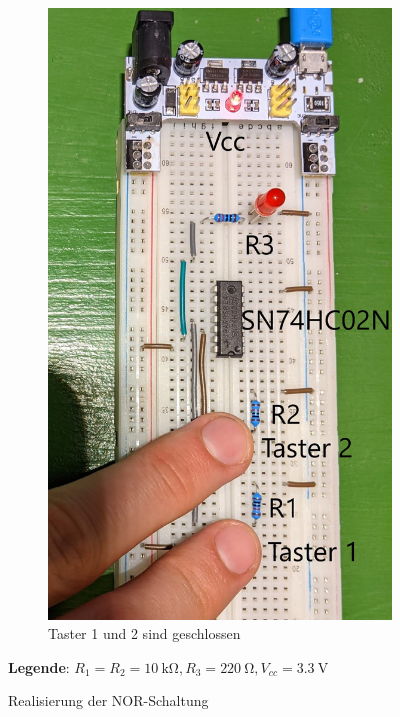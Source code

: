\documentclass[
    paper=a4,
]{scrartcl}
\newcommand{\legend}[1]{\par\footnotesize\textbf{Legende}: #1\par}
\begin{document}
\begin{figure}
\begin{subfigure}[t]{0.3\textwidth}
            \includegraphics[width=0.9\linewidth]{Anhang/Bild3.3.jpg}
            \caption{Taster 1 und 2 sind geschlossen}
        \end{subfigure}
        \caption{Realisierung der NOR-Schaltung}
        \legend{\(R_1=R_2=\SI{10}{\kilo\ohm}, R_3=\SI{220}{\ohm}, V_{cc}=\SI{3.3}{\volt}\)}
        \label{fig:3}
    \end{figure}
\end{document}
